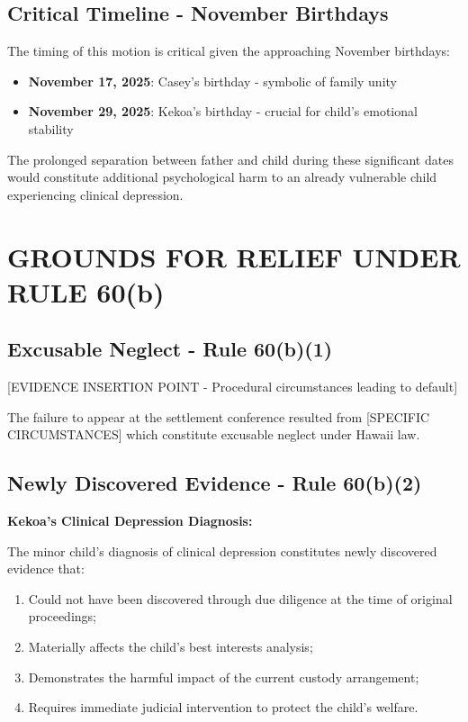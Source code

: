 \documentclass[12pt,letterpaper]{article}
\begin{document}
\subsection{Critical Timeline - November Birthdays}

The timing of this motion is critical given the approaching November birthdays:

\begin{itemize}
\item \textbf{November 17, 2025}: Casey's birthday - symbolic of family unity
\item \textbf{November 29, 2025}: Kekoa's birthday - crucial for child's emotional stability
\end{itemize}

The prolonged separation between father and child during these significant dates would constitute additional psychological harm to an already vulnerable child experiencing clinical depression.

\section{GROUNDS FOR RELIEF UNDER RULE 60(b)}

\subsection{Excusable Neglect - Rule 60(b)(1)}

[EVIDENCE INSERTION POINT - Procedural circumstances leading to default]

The failure to appear at the settlement conference resulted from [SPECIFIC CIRCUMSTANCES] which constitute excusable neglect under Hawaii law.

\subsection{Newly Discovered Evidence - Rule 60(b)(2)}

\textbf{Kekoa's Clinical Depression Diagnosis:}

The minor child's diagnosis of clinical depression constitutes newly discovered evidence that:

\begin{enumerate}
\item Could not have been discovered through due diligence at the time of original proceedings;
\item Materially affects the child's best interests analysis;
\item Demonstrates the harmful impact of the current custody arrangement;
\item Requires immediate judicial intervention to protect the child's welfare.
\end{enumerate}
\end{document}
